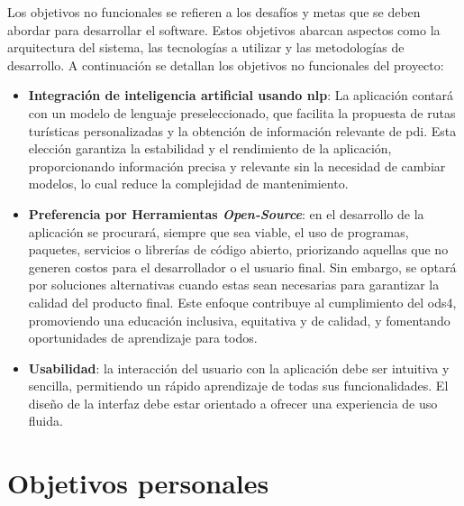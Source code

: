 Los objetivos no funcionales se refieren a los desafíos y metas que se deben abordar para desarrollar el software. Estos objetivos abarcan aspectos como la arquitectura del sistema, las tecnologías a utilizar y las metodologías de desarrollo. A continuación se detallan los objetivos no funcionales del proyecto:

\begin{itemize}
	\item \textbf{Integración de inteligencia artificial usando \acrfull{nlp}}: La aplicación contará con un modelo de lenguaje preseleccionado, que facilita la propuesta de rutas turísticas personalizadas y la obtención de información relevante de \acrlong{pdi}. Esta elección garantiza la estabilidad y el rendimiento de la aplicación, proporcionando información precisa y relevante sin la necesidad de cambiar modelos, lo cual reduce la complejidad de mantenimiento.
    \item \textbf{Preferencia por Herramientas \textit{Open-Source}}: en el desarrollo de la aplicación se procurará, siempre que sea viable, el uso de programas, paquetes, servicios o librerías de código abierto, priorizando aquellas que no generen costos para el desarrollador o el usuario final. Sin embargo, se optará por soluciones alternativas cuando estas sean necesarias para garantizar la calidad del producto final. Este enfoque contribuye al cumplimiento del \acrfull{ods4}, promoviendo una educación inclusiva, equitativa y de calidad, y fomentando oportunidades de aprendizaje para todos.
    \item \textbf{Usabilidad}: la interacción del usuario con la aplicación debe ser intuitiva y sencilla, permitiendo un rápido aprendizaje de todas sus funcionalidades. El diseño de la interfaz debe estar orientado a ofrecer una experiencia de uso fluida. 
\end{itemize}

\section{Objetivos personales}

